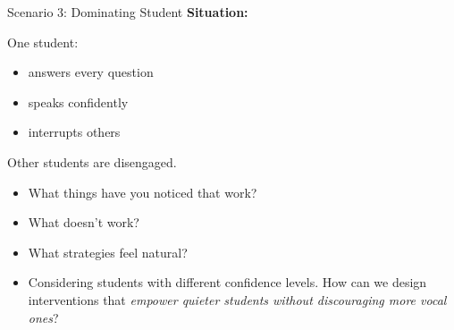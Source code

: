 \documentclass[dvipsnames]{beamer}
\begin{document}

\begin{frame}{Scenario 3: Dominating Student}
\textbf{Situation:}

One student:
\begin{itemize}
\item answers every question
\item speaks confidently
\item interrupts others
\end{itemize}

Other students are disengaged.
\begin{itemize}
    \item What things have you noticed that work?
    \item What doesn’t work?
    \item What strategies feel natural?
    \item Considering students with different confidence levels. How can we design interventions that \emph{empower quieter students without discouraging more vocal ones}?
\end{itemize}
\end{frame}
\end{document}
